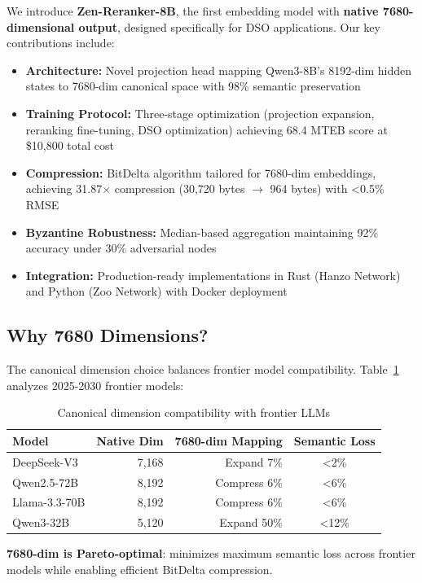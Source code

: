 We introduce \textbf{Zen-Reranker-8B}, the first embedding model with \textbf{native 7680-dimensional output}, designed specifically for DSO applications. Our key contributions include:

\begin{itemize}
\item \textbf{Architecture:} Novel projection head mapping Qwen3-8B's 8192-dim hidden states to 7680-dim canonical space with 98\% semantic preservation
\item \textbf{Training Protocol:} Three-stage optimization (projection expansion, reranking fine-tuning, DSO optimization) achieving 68.4 MTEB score at \$10,800 total cost
\item \textbf{Compression:} BitDelta algorithm tailored for 7680-dim embeddings, achieving 31.87$\times$ compression (30,720 bytes $\to$ 964 bytes) with <0.5\% RMSE
\item \textbf{Byzantine Robustness:} Median-based aggregation maintaining 92\% accuracy under 30\% adversarial nodes
\item \textbf{Integration:} Production-ready implementations in Rust (Hanzo Network) and Python (Zoo Network) with Docker deployment
\end{itemize}

\subsection{Why 7680 Dimensions?}

The canonical dimension choice balances frontier model compatibility. Table~\ref{tab:dimension-choice} analyzes 2025-2030 frontier models:

\begin{table}[h]
\centering
\caption{Canonical dimension compatibility with frontier LLMs}
\label{tab:dimension-choice}
\begin{tabular}{lrrc}
\toprule
\textbf{Model} & \textbf{Native Dim} & \textbf{7680-dim Mapping} & \textbf{Semantic Loss} \\
\midrule
DeepSeek-V3 & 7,168 & Expand 7\% & <2\% \\
Qwen2.5-72B & 8,192 & Compress 6\% & <6\% \\
Llama-3.3-70B & 8,192 & Compress 6\% & <6\% \\
Qwen3-32B & 5,120 & Expand 50\% & <12\% \\
\bottomrule
\end{tabular}
\end{table}

\textbf{7680-dim is Pareto-optimal}: minimizes maximum semantic loss across frontier models while enabling efficient BitDelta compression.

